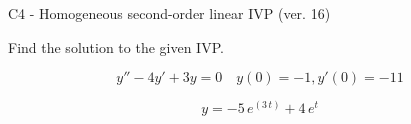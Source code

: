 \begin{exercise}
  \begin{exerciseTitle}C4 - Homogeneous second-order linear IVP (ver. 16)\end{exerciseTitle}
  \begin{exerciseStatement}
    
Find the solution to the given IVP.

    
\[y''-4y'+3y = 0 \hspace{1em} y(0) = -1 , y'(0) = -11\]

  \end{exerciseStatement}
  \begin{exerciseAnswer}
    
\[y= -5 \, e^{\left(3 \, t\right)} + 4 \, e^{t}\]

  \end{exerciseAnswer}
\end{exercise}